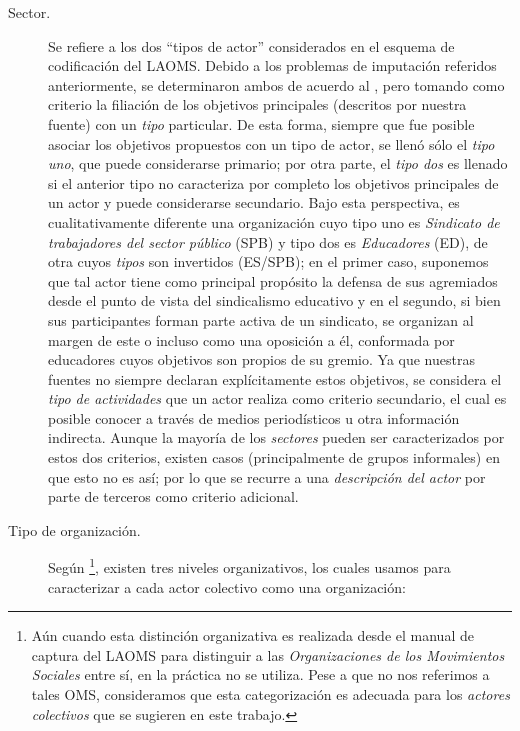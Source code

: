 \documentclass[letterpaper, 11pt]{book}
\theoremstyle{definition}
\theoremstyle{remark}
\begin{document}
\begin{description}
    
    \item[Sector.] Se refiere a los dos ``tipos de actor'' considerados en el esquema de codificación del LAOMS. 
    Debido a los problemas de imputación referidos anteriormente, se determinaron ambos de acuerdo al , pero tomando como criterio la filiación de los objetivos principales (descritos por nuestra fuente) con un \emph{tipo} particular. 
    De esta forma, siempre que fue posible asociar los objetivos propuestos con un tipo de actor, se llenó sólo el \emph{tipo uno}, que puede considerarse primario; por otra parte, el \emph{tipo dos} es llenado si el anterior tipo no caracteriza por completo los objetivos principales de un actor y puede considerarse secundario. 
    Bajo esta perspectiva, es cualitativamente diferente una organización cuyo tipo uno es \emph{Sindicato de trabajadores del sector público} (SPB) y tipo dos es \emph{Educadores} (ED), de otra cuyos \emph{tipos} son invertidos (ES/SPB); en el primer caso, suponemos que tal actor tiene como principal propósito la defensa de sus agremiados desde el punto de vista del sindicalismo educativo y en el segundo, si bien sus participantes forman parte activa de un sindicato, se organizan al margen de este o incluso como una oposición a él, conformada por educadores cuyos objetivos son propios de su gremio. 
    Ya que nuestras fuentes no siempre declaran explícitamente estos objetivos, se considera el \emph{tipo de actividades} que un actor realiza como criterio secundario, el cual es posible conocer a través de medios periodísticos u otra información indirecta. 
    Aunque la mayoría de los \emph{sectores} pueden ser caracterizados por estos dos criterios, existen casos (principalmente de grupos informales) en que esto no es así; por lo que se recurre a una \emph{descripción del actor} por parte de terceros como criterio adicional.
    
    
    \item[Tipo de organización.] Según \citet{2017_Cadena_ManualLAOMS}\footnote{
	Aún cuando esta distinción organizativa es realizada desde el manual de captura del LAOMS para distinguir a las \emph{Organizaciones de los Movimientos Sociales} entre sí, en la práctica no se utiliza. 
	Pese a que no nos referimos a tales OMS, consideramos que esta categorización es adecuada para los \emph{actores colectivos} que se sugieren en este trabajo.
    }, existen tres niveles organizativos, los cuales usamos para caracterizar a cada actor colectivo como una organización:
    \begin{itemize}
        

\end{itemize}
\end{description}
\end{document}

